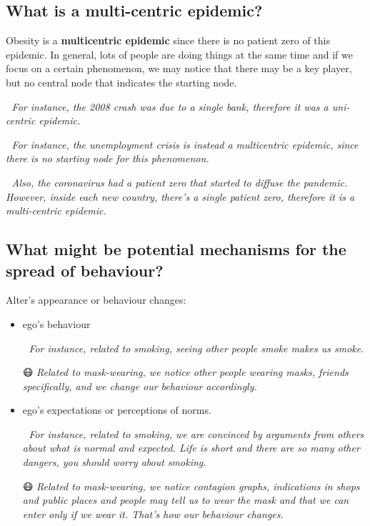 \documentclass[
  notitlepage,
  onecolumn,
  openany]{book}
\begin{document}
\hypertarget{what-is-a-multi-centric-epidemic}{%
\subsection{What is a multi-centric epidemic?}\label{what-is-a-multi-centric-epidemic}}

Obesity is a \textbf{multicentric epidemic} since there is no patient zero of this epidemic. In general, lots of people are doing things at the same time and if we focus on a certain phenomenon, we may notice that there may be a key player, but no central node that indicates the starting node.

🏦 \emph{For instance, the 2008 crash was due to a single bank, therefore it was a uni-centric epidemic.}

💼 \emph{For instance, the unemployment crisis is instead a multicentric epidemic, since there is no starting node for this phenomenon.}

🦠 \emph{Also, the coronavirus had a patient zero that started to diffuse the pandemic. However, inside each new country, there's a single patient zero, therefore it is a multi-centric epidemic.}

\hypertarget{what-might-be-potential-mechanisms-for-the-spread-of-behaviour}{%
\subsection{What might be potential mechanisms for the spread of behaviour?}\label{what-might-be-potential-mechanisms-for-the-spread-of-behaviour}}

Alter's appearance or behaviour changes:

\begin{itemize}
\item
  ego's behaviour

  🚬 \emph{For instance, related to smoking, seeing other people smoke makes us smoke.}

  😷 \emph{Related to mask-wearing, we notice other people wearing masks, friends specifically, and we change our behaviour accordingly.}
\item
  ego's expectations or perceptions of norms.

  🚬 \emph{For instance, related to smoking, we are convinced by arguments from others about what is normal and expected. Life is short and there are so many other dangers, you should worry about smoking.}

  😷 \emph{Related to mask-wearing, we notice contagion graphs, indications in shops and public places and people may tell us to wear the mask and that we can enter only if we wear it. That's how our behaviour changes.}
\end{itemize}
\end{document}
